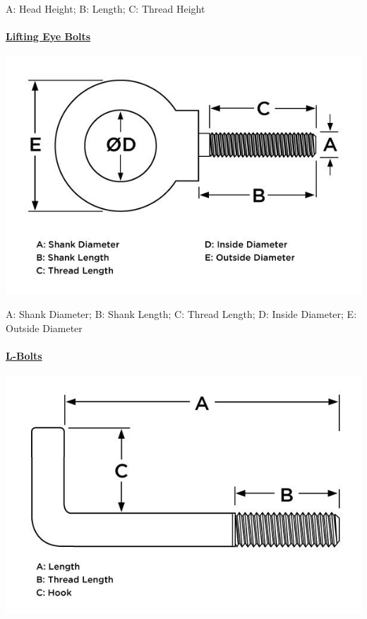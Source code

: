 \documentclass[english,]{article}
\let\oldparagraph\paragraph
\renewcommand{\paragraph}[1]{\oldparagraph{#1}\mbox{}}
\begin{document}
\hypertarget{izm4mmm}{}
A: Head Height; B: Length; C: Thread Height

\hypertarget{igkw95g}{}
\hypertarget{i5213mh}{%
\paragraph{\texorpdfstring{\href{https://www.huyett.com/all-products/bolts/eye-bolts}{Lifting
Eye Bolts}}{Lifting Eye Bolts}}\label{i5213mh}}

\includegraphics{Introduction to Nut and Bolt Sizes_files/6307bcfa5c57d694202170.jpg}

\hypertarget{ijtjve5}{}
A: Shank Diameter; B: Shank Length; C: Thread Length; D: Inside
Diameter; E: Outside Diameter

\hypertarget{i9gqtac}{}
\hypertarget{i8b9v29}{}
\hypertarget{il3jc1y}{%
\paragraph{\texorpdfstring{\href{https://www.huyett.com/product/search?search=l-bolt}{L-Bolts}}{L-Bolts}}\label{il3jc1y}}

\includegraphics{Introduction to Nut and Bolt Sizes_files/6307bd9dd0447291869107.jpg}
\end{document}
